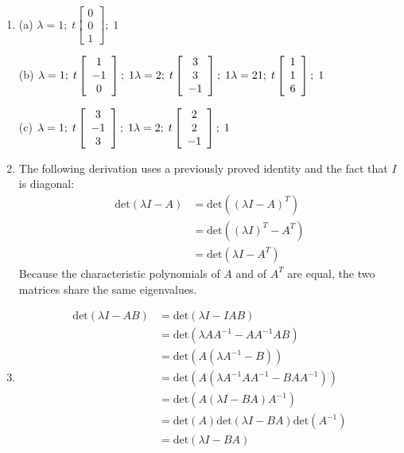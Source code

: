 \documentclass[a4paper, 12pt]{article}
\begin{document}
\begin{enumerate}
		\item (a) $\lambda = 1 ;\;
		t\left[ \begin{array}{c}
		0 \\
		0 \\
		1
		\end{array} \right] ;\;
		1$ \par
		(b) $\lambda = 1 ;\;
		t\left[ \begin{array}{c}
		1 \\
		-1 \\
		0
		\end{array} \right] ;\;
		1 \\
		\lambda = 2 ;\;
		t\left[ \begin{array}{c}
		3 \\
		3 \\
		-1
		\end{array} \right] ;\;
		1 \\
		\lambda = 21 ;\;
		t\left[ \begin{array}{c}
		1 \\
		1 \\
		6
		\end{array} \right] ;\;
		1$ \par
		(c) $\lambda = 1 ;\;
		t\left[ \begin{array}{c}
		3 \\
		-1 \\
		3
		\end{array} \right] ;\;
		1 \\
		\lambda = 2 ;\;
		t\left[ \begin{array}{c}
		2 \\
		2 \\
		-1
		\end{array} \right] ;\;
		1$
		
		\setcounter{enumi}{9}
		\item The following derivation uses a previously proved identity and the fact that $I$ is diagonal:
		\begin{align*}
		\mbox{det}(\lambda I - A) &= \mbox{det}((\lambda I - A)^T) \\
		&= \mbox{det}((\lambda I)^T - A^T) \\
		&= \mbox{det}(\lambda I - A^T)
		\end{align*}
		Because the characteristic polynomials of $A$ and of $A^T$ are equal, the two matrices share the same eigenvalues.
		
		\item
		\begin{align*}
		\mbox{det}(\lambda I - AB) &= \mbox{det}(\lambda I - IAB) \\
		&= \mbox{det}(\lambda AA^{-1} - AA^{-1}AB) \\
		&= \mbox{det}(A(\lambda A^{-1} - B)) \\
		&= \mbox{det}(A(\lambda A^{-1}AA^{-1} - BAA^{-1})) \\
		&= \mbox{det}(A(\lambda I - BA)A^{-1}) \\
		&= \mbox{det}(A)\mbox{det}(\lambda I - BA)\mbox{det}(A^{-1}) \\
		&= \mbox{det}(\lambda I - BA)
		\end{align*}
	\end{enumerate}
	
\end{document}

